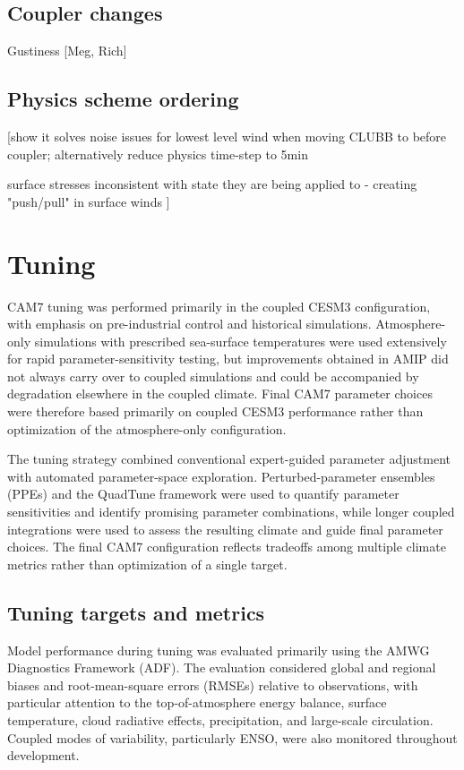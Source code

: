 \documentclass[draft]{agujournal2019}
\begin{document}
 \subsection{Coupler changes}
 Gustiness [Meg, Rich]
 \subsection{Physics scheme ordering}
 [show it solves noise issues for lowest level wind when moving CLUBB to before coupler; alternatively reduce physics time-step to 5min

 surface stresses inconsistent with state they are being applied to - creating "push/pull" in surface winds
 ]
 
\section{Tuning}
CAM7 tuning was performed primarily in the coupled CESM3 configuration, with emphasis on pre-industrial control and historical simulations. Atmosphere-only simulations with prescribed sea-surface temperatures were used extensively for rapid parameter-sensitivity testing, but improvements obtained in AMIP did not always carry over to coupled simulations and could be accompanied by degradation elsewhere in the coupled climate. Final CAM7 parameter choices were therefore based primarily on coupled CESM3 performance rather than optimization of the atmosphere-only configuration.

The tuning strategy combined conventional expert-guided parameter adjustment with automated parameter-space exploration. Perturbed-parameter ensembles (PPEs) and the QuadTune framework were used to quantify parameter sensitivities and identify promising parameter combinations, while longer coupled integrations were used to assess the resulting climate and guide final parameter choices. The final CAM7 configuration reflects tradeoffs among multiple climate metrics rather than optimization of a single target.

\subsection{Tuning targets and metrics}
Model performance during tuning was evaluated primarily using the AMWG Diagnostics Framework (ADF). The evaluation considered global and regional biases and root-mean-square errors (RMSEs) relative to observations, with particular attention to the top-of-atmosphere energy balance, surface temperature, cloud radiative effects, precipitation, and large-scale circulation. Coupled modes of variability, particularly ENSO, were also monitored throughout development.
\end{document}
